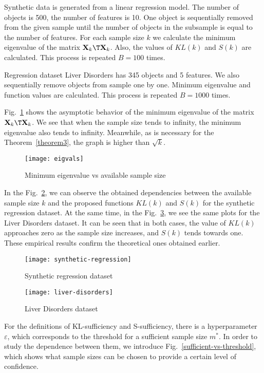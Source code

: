 \documentclass[runningheads]{llncs}
\begin{document}
Synthetic data is generated from a linear regression model. The number of objects is 500, the number of features is 10. One object is sequentially removed from the given sample until the number of objects in the subsample is equal to the number of features. For each sample size $k$ we calculate the minimum eigenvalue of the matrix $\mathbf{X}_k\T \mathbf{X}_k$. Also, the values of $KL(k)$ and $S(k)$ are calculated. This process is repeated $B=100$ times.

Regression dataset Liver Disorders has 345 objects and 5 features. We also sequentially remove objects from sample one by one. Minimum eigenvalue and function values are calculated. This process is repeated $B=1000$ times.

Fig.~\ref{eigvals} shows the asymptotic behavior of the minimum eigenvalue of the matrix $\mathbf{X}_k\T \mathbf{X}_k$. We see that when the sample size tends to infinity, the minimum eigenvalue also tends to infinity. Meanwhile, as is necessary for the Theorem~\ref{theorem3}, the graph is higher than $\sqrt{k}$.

\begin{figure}[ht]
    \centering
    \texttt{[image: eigvals]}
    \caption{Minimum eigenvalue vs available sample size}
    \label{eigvals}
\end{figure}

In the Fig.~\ref{synthetic-regression}, we can observe the obtained dependencies between the available sample size $k$ and the proposed functions $KL(k)$ and $S(k)$ for the synthetic regression dataset. At the same time, in the Fig.~\ref{liver-disorders}, we see the same plots for the Liver Disorders dataset. It can be seen that in both cases, the value of $KL(k)$ approaches zero as the sample size increases, and $S(k)$ tends towards one. These empirical results confirm the theoretical ones obtained earlier.

\begin{figure}[ht]
    \centering
    \texttt{[image: synthetic-regression]}
    \caption{Synthetic regression dataset}
    \label{synthetic-regression}
\end{figure}

\begin{figure}[ht]
    \centering
    \texttt{[image: liver-disorders]}
    \caption{Liver Disorders dataset}
    \label{liver-disorders}
\end{figure}

For the definitions of KL-sufficiency and S-sufficiency, there is a hyperparameter $\varepsilon$, which corresponds to the threshold for a sufficient sample size $m^*$. In order to study the dependence between them, we introduce Fig.~\ref{sufficient-vs-threshold}, which shows what sample sizes can be chosen to provide a certain level of confidence.
\end{document}

